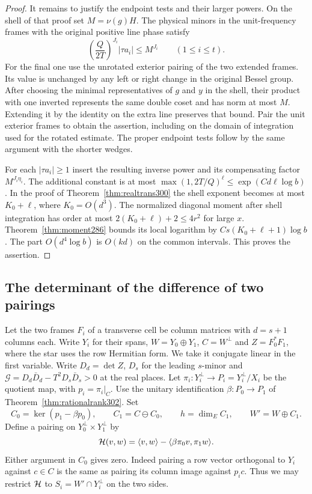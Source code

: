 \documentclass[a4paper,11pt]{article}
\theoremstyle{definition}
\theoremstyle{remark}
\numberwithin{equation}{section}
\begin{document}
\begin{proof}
It remains to justify the endpoint tests and their larger powers.
On the shell of that proof set \(M=\nu(g)H\). The physical
minors in the unit-frequency frames with the original positive
line phase satisfy
\[
        \left(\frac{Q}{2T}\right)^{J_i}|\tau a_i|\le M^{J_i}
                  \qquad (1\le i\le t).
\]
For the final one use the unrotated exterior pairing of the
two extended frames. Its value is unchanged by any left or
right change in the original Bessel group. After choosing the
minimal representatives of \(g\) and \(y\) in the shell, their
product with one inverted represents the same double coset
and has norm at most \(M\). Extending it by the identity on
the extra line preserves that bound. Pair the unit exterior
frames to obtain the assertion, including on the domain of
integration used for the rotated estimate. The proper endpoint
tests follow by the same argument with the shorter wedges.

For each \(|\tau a_i|\ge1\) insert the resulting inverse
power and its compensating factor \(M^{J_i\eta_i}\).
The additional constant is at most
\(\max(1,2T/Q)^\ell\le\exp(Cd\ell\log b)\).
In the proof of Theorem~\ref{thm:realtrans300} the shell
exponent becomes at most \(K_0+\ell\), where \(K_0=O(d^3)\).
The normalized diagonal moment after shell integration has
order at most \(2(K_0+\ell)+2\le4r^2\) for large \(x\).
Theorem~\ref{thm:moment286} bounds its local logarithm by
\(C s(K_0+\ell+1)\log b\).
The part \(O(d^4\log b)\) is \(O(kd)\) on the common
intervals. This proves the assertion.
\end{proof}

\subsection{The determinant of the difference of two pairings}\label{nav:V-56}
Let the two frames \(F_i\) of a transverse cell be column
matrices with \(d=s+1\) columns each. Write \(Y_i\) for their
spans, \(W=Y_0\oplus Y_1\), \(C=W^\perp\) and
\(Z=F_0^*F_1\), where the star uses the row Hermitian form.
We take it conjugate linear in the first variable. Write
\(D_d=\det Z\), \(D_s\) for the leading \(s\)-minor and
\(\mathcal G=D_d\bar D_d-T^2D_s\bar D_s>0\) at the real
places. Let \(\pi_i:Y_i^\perp\to P_i=Y_i^\perp/X_i\)
be the quotient map, with \(p_i=\pi_i|_C\).
Use the unitary identification \(\beta:P_0\to P_1\) of
Theorem~\ref{thm:rationalrank302}. Set
\[
 C_0=\ker(p_1-\beta p_0),\qquad C_1=C\ominus C_0,\qquad
 h=\dim_E C_1,\qquad W'=W\oplus C_1 .
\]
Define a pairing on \(Y_0^\perp\times Y_1^\perp\) by
\[
 {\cal H}(v,w)=\langle v,w\rangle-
                        \langle\beta\pi_0 v,\pi_1 w\rangle .
\]
Either argument in \(C_0\) gives zero. Indeed pairing a row
vector orthogonal to \(Y_i\) against \(c\in C\) is the same
as pairing its column image against \(p_i c\). Thus we may
restrict \({\cal H}\) to \(S_i=W'\cap Y_i^\perp\) on the two sides.
\end{document}
